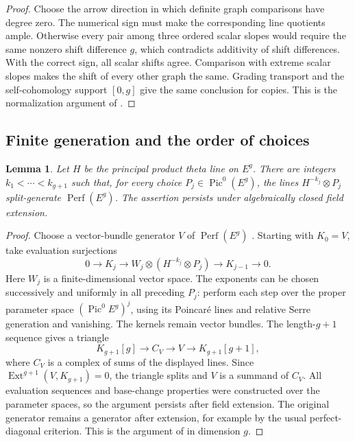 \documentclass[11pt]{article}
\numberwithin{equation}{section}
\newtheorem{lemma}[theorem]{Lemma}
\theoremstyle{definition}
\theoremstyle{remark}
\DeclareMathOperator{\Ext}{Ext}
\DeclareMathOperator{\Perf}{Perf}
\begin{document}
\begin{proof}
Choose the arrow direction in which definite graph comparisons have
degree zero.  The numerical sign must make the corresponding line
quotients ample.  Otherwise every pair among three ordered scalar
slopes would require the same nonzero shift difference $g$, which
contradicts additivity of shift differences.  With the correct sign,
all scalar shifts agree.  Comparison with extreme scalar slopes makes
the shift of every other graph the same.  Grading transport and the
self-cohomology support $[0,g]$ give the same conclusion for copies.
This is the normalization argument of \cite[Lemma~9.2]{A8}.
\end{proof}

\subsection{Finite generation and the order of choices}

\begin{lemma}
\label{setup:graph-generation}
Let $H$ be the principal product theta line on $E^g$.  There are
integers $k_1<\cdots<k_{g+1}$ such that, for every choice
$P_j\in\operatorname{Pic}^0(E^g)$, the lines
$H^{-k_j}\otimes P_j$ split-generate $\Perf(E^g)$.
The assertion persists under algebraically closed field extension.
\end{lemma}

\begin{proof}
Choose a vector-bundle generator $V$ of $\Perf(E^g)$
\cite{BondalVanDenBergh}.  Starting with $K_0=V$, take evaluation
surjections
\[
 0\longrightarrow K_j\longrightarrow
 W_j\otimes(H^{-k_j}\otimes P_j)
 \longrightarrow K_{j-1}\longrightarrow0.
\]
Here $W_j$ is a finite-dimensional vector space.  The exponents can be
chosen successively and uniformly in all preceding $P_j$: perform each
step over the proper parameter space
$(\operatorname{Pic}^0 E^g)^j$, using its Poincar\'e lines and relative
Serre generation and vanishing.  The kernels remain vector bundles.
The length-$g+1$ sequence gives a triangle
\[
 K_{g+1}[g]\longrightarrow C_V\longrightarrow V
 \longrightarrow K_{g+1}[g+1],
\]
where $C_V$ is a complex of sums of the displayed lines.  Since
$\Ext^{g+1}(V,K_{g+1})=0$, the triangle splits and $V$ is a summand of
$C_V$.  All evaluation sequences and base-change properties were
constructed over the parameter spaces, so the argument persists after
field extension.  The original generator remains a generator after
extension, for example by the usual perfect-diagonal criterion.
This is the argument of \cite[Lemma~9.3]{A8} in dimension $g$.
\end{proof}
\end{document}
